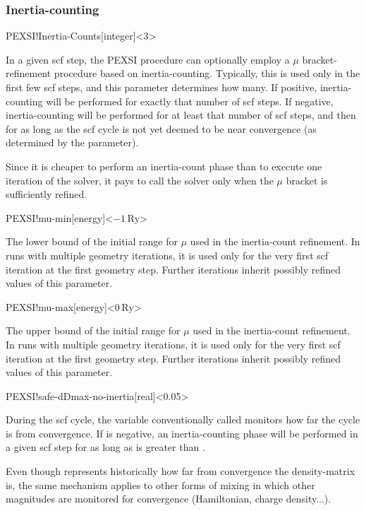 \subsubsection{Inertia-counting}


\begin{fdfentry}{PEXSI!Inertia-Counts}[integer]<3>

  In a given scf step, the PEXSI procedure can optionally employ a
  $\mu$ bracket-refinement procedure based on
  inertia-counting. Typically, this is used only in the first few scf
  steps, and this parameter determines how many. If positive,
  inertia-counting will be performed for exactly that number of scf
  steps. If negative, inertia-counting will be performed for at least
  that number of scf steps, and then for as long as the scf cycle is
  not yet deemed to be near convergence (as determined by the
   parameter).

  \note Since it is cheaper to perform an inertia-count phase than to
  execute one iteration of the solver, it pays to call the solver only
  when the $\mu$ bracket is sufficiently refined.

\end{fdfentry}

\begin{fdfentry}{PEXSI!mu-min}[energy]<$-1\,\mathrm{Ry}$>

  The lower bound of the initial range for $\mu$ used in the
  inertia-count refinement. In runs with multiple geometry iterations,
  it is used only for the very first scf iteration at the first
  geometry step. Further iterations inherit possibly refined values of
  this parameter.

\end{fdfentry}

\begin{fdfentry}{PEXSI!mu-max}[energy]<$0\,\mathrm{Ry}$>

  The upper bound of the initial range for $\mu$ used in the
  inertia-count refinement. In runs with multiple geometry iterations,
  it is used only for the very first scf iteration at the first
  geometry step. Further iterations inherit possibly refined values of
  this parameter.

\end{fdfentry}

\begin{fdfentry}{PEXSI!safe-dDmax-no-inertia}[real]<0.05>

  During the scf cycle, the variable conventionally called
   monitors how far the cycle is from convergence. If
   is negative, an inertia-counting phase
  will be performed in a given scf step for as long as  is
  greater than .

  \note Even though  represents historically how far from
  convergence the density-matrix is, the same mechanism applies to
  other forms of mixing in which other magnitudes are monitored for
  convergence (Hamiltonian, charge density...).
  
\end{fdfentry}


